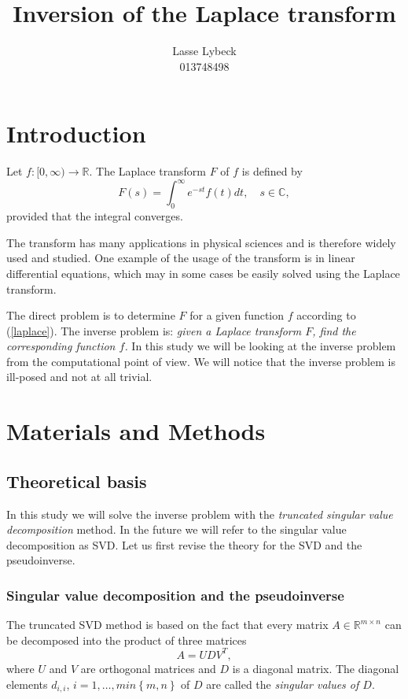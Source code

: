 \documentclass[12pt,a4]{article}
\title{Inversion of the Laplace transform}
\author{Lasse Lybeck\\013748498}
\newcommand{\R}{{\mathbb R}}
\newcommand{\C}{{\mathbb C}}
\begin{document}
\maketitle

\section{Introduction}

Let $f:[0,\infty)\rightarrow \R$. The Laplace transform $F$ of $f$ is defined by
\begin{equation}\label{laplace}
 F(s) = \int_0^\infty e^{-st}f(t)dt,\quad s\in\C ,
\end{equation}
provided that the integral converges.

The transform has many applications in physical sciences and is therefore widely used and studied. One example of the usage of the transform is in linear differential equations, which may in some cases be easily solved using the Laplace transform.

The direct problem is to determine $F$ for a given function $f$ according to (\ref{laplace}). The inverse problem is: {\em given a Laplace transform $F$, find the corresponding function $f$.} In this study we will be looking at the inverse problem from the computational point of view. We will notice that the inverse problem is ill-posed and not at all trivial.




\section{Materials and Methods}\label{sec:methods}

\subsection{Theoretical basis}

In this study we will solve the inverse problem with the \emph{truncated singular value decomposition} method. In the future we will refer to the singular value decomposition as SVD. Let us first revise the theory for the SVD and the pseudoinverse.

\subsubsection{Singular value decomposition and the pseudoinverse}

The truncated SVD method is based on the fact that every matrix $A \in \R^{m \times n}$ can be decomposed into the product of three matrices
\begin{equation}
A = U D V^T,
\end{equation}
where $U$ and $V$ are orthogonal matrices and $D$ is a diagonal matrix. The diagonal elements $d_{i,i}$, $i = 1, \ldots , min \left\{ m,n \right\}$ of $D$ are called the \emph{singular values of $D$}.
\end{document}
